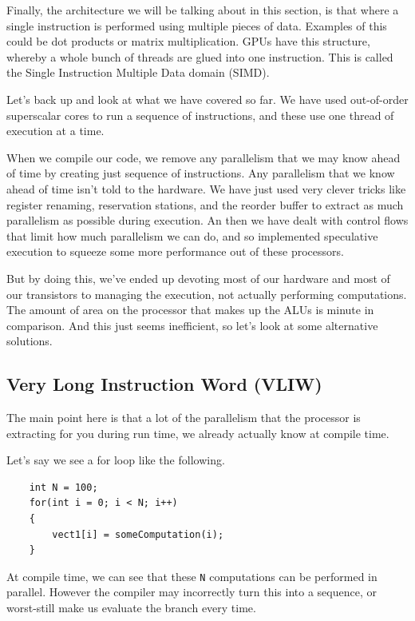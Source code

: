 \documentclass{article}
\begin{document}
Finally, the architecture we will be talking about in this section, is that where a single instruction is performed using multiple pieces of data. Examples of this could be dot products or matrix multiplication. GPUs have this structure, whereby a whole bunch of threads are glued into one instruction. This is called the Single Instruction Multiple Data domain (SIMD). 

Let's back up and look at what we have covered so far. We have used out-of-order superscalar cores to run a sequence of instructions, and these use one thread of execution at a time. 

When we compile our code, we remove any parallelism that we may know ahead of time by creating just sequence of instructions. Any parallelism that we know ahead of time isn't told to the hardware. We have just used very clever tricks like register renaming, reservation stations, and the reorder buffer to extract as much parallelism as possible during execution. An then we have dealt with control flows that limit how much parallelism we can do, and so implemented  speculative execution to squeeze some more performance out of these processors. 

But by doing this, we've ended up devoting most of our hardware and most of our transistors to managing the execution, not actually performing computations. The amount of area on the processor that makes up the ALUs is minute in comparison. And this just seems inefficient, so let's look at some alternative  solutions. 

\subsection{Very Long Instruction Word (VLIW)}

The main point here is that a lot of the parallelism that the processor is extracting for you during run time, we already actually know at compile time.

Let's say we see a for loop like the following.

\begin{verbatim}
    int N = 100;
    for(int i = 0; i < N; i++)
    {
        vect1[i] = someComputation(i);    
    }
\end{verbatim}

At compile time, we can see that these  \texttt{N} computations  can be performed in parallel. However the compiler may incorrectly turn this into a sequence, or worst-still make us evaluate the branch every time. 
\end{document}
